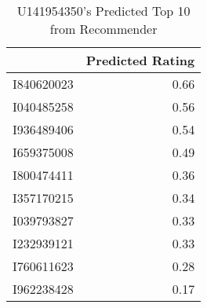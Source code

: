 \begin{table}[ht]
\centering
\caption{U141954350's Predicted Top 10 from Recommender} 
\label{tab:topn}
\begin{tabular}{rr}
  \hline
 & Predicted Rating \\ 
  \hline
I840620023 & 0.66 \\ 
  I040485258 & 0.56 \\ 
  I936489406 & 0.54 \\ 
  I659375008 & 0.49 \\ 
  I800474411 & 0.36 \\ 
  I357170215 & 0.34 \\ 
  I039793827 & 0.33 \\ 
  I232939121 & 0.33 \\ 
  I760611623 & 0.28 \\ 
  I962238428 & 0.17 \\ 
   \hline
\end{tabular}
\end{table}
